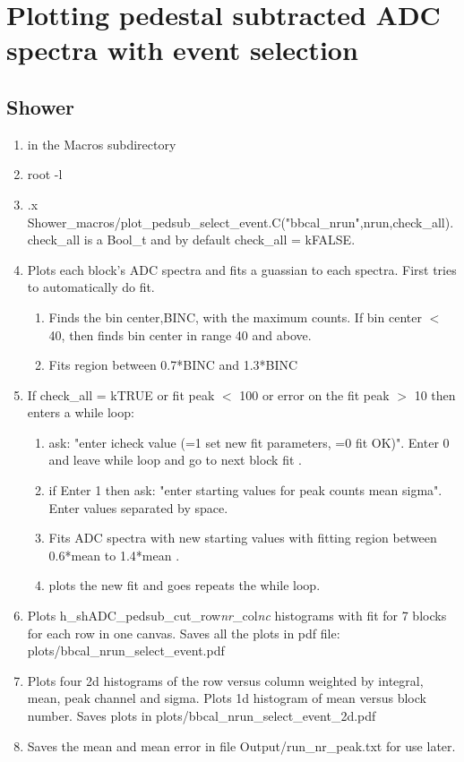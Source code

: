 \documentclass[]{article}
\begin{document}
\section{Plotting pedestal subtracted ADC spectra with event selection}
\subsection{Shower}
\begin{enumerate}
	\item in the Macros subdirectory
	\item root -l
	\item .x Shower\_macros/plot\_pedsub\_select\_event.C("bbcal\_nrun",nrun,check\_all). check\_all is a Bool\_t and by default check\_all = kFALSE. 
	\item Plots each block's ADC spectra and fits a guassian to each spectra. First tries to automatically do fit.
	\begin{enumerate}
		\item Finds the bin center,BINC,  with the maximum counts. If bin center $<$ 40, then finds bin center in range 40 and above.
		\item Fits region between 0.7*BINC and 1.3*BINC
	\end{enumerate} 
     \item If check\_all = kTRUE or fit peak $<$ 100 or error on the fit peak $>$ 10 then enters a while loop:
	\begin{enumerate}
     \item ask: "enter icheck value (=1 set new fit parameters, =0 fit OK)". Enter 0 and leave while loop and go to next block fit .
     \item if Enter 1 then ask: "enter starting values for  peak counts mean sigma". Enter values separated by space.
     \item Fits ADC spectra with new starting values with fitting region between 0.6*mean to 1.4*mean .
     \item plots the new fit and goes repeats the while loop.
	\end{enumerate}       
	\item Plots  h\_shADC\_pedsub\_cut\_row{\it nr}\_col{\it nc} histograms with fit for 7 blocks for each row in one canvas. Saves all the plots in pdf file: plots/bbcal\_nrun\_select\_event.pdf
	\item Plots four 2d histograms of the row versus column weighted by integral, mean, peak channel and sigma. Plots 1d histogram of mean versus block number. Saves plots in  plots/bbcal\_nrun\_select\_event\_2d.pdf
	\item Saves the mean and mean error in file Output/run\_nr\_peak.txt for use later.
\end{enumerate}
\end{document}
